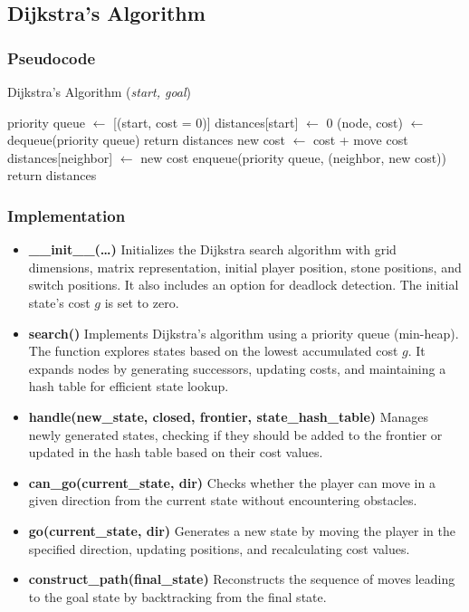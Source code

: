 \subsection{Dijkstra's Algorithm}

\subsubsection{Pseudocode}
\begin{algorithm}[H]
	\caption{Dijkstra's Algorithm (\textit{start, goal})}
	\label{alg:dijkstra}
	\begin{algorithmic}[1]
		\State priority queue \(\gets\) [(start, cost = 0)]
		\State distances[start] \(\gets\) 0
		\State (node, cost) \(\gets\) dequeue(priority queue)
		\State return distances
		\EndIf
		\State new cost \(\gets\) cost + move cost
		\State distances[neighbor] \(\gets\) new cost
		\State enqueue(priority queue, (neighbor, new cost))
		\EndIf
		\EndFor
		\EndWhile
		\State return distances
	\end{algorithmic}
\end{algorithm}

\subsubsection{Implementation}
\begin{itemize}
	\item \textbf{\_\_init\_\_(\ldots)}
	      Initializes the Dijkstra search algorithm with grid dimensions, matrix representation, initial player position, stone positions, and switch positions. It also includes an option for deadlock detection. The initial state's cost \( g \) is set to zero.

	\item \textbf{search()}
	      Implements Dijkstra's algorithm using a priority queue (min-heap). The function explores states based on the lowest accumulated cost \( g \). It expands nodes by generating successors, updating costs, and maintaining a hash table for efficient state lookup.

	\item \textbf{handle(new\_state, closed, frontier, state\_hash\_table)}
	      Manages newly generated states, checking if they should be added to the frontier or updated in the hash table based on their cost values.

	\item \textbf{can\_go(current\_state, dir)}
	      Checks whether the player can move in a given direction from the current state without encountering obstacles.

	\item \textbf{go(current\_state, dir)}
	      Generates a new state by moving the player in the specified direction, updating positions, and recalculating cost values.

	\item \textbf{construct\_path(final\_state)}
	      Reconstructs the sequence of moves leading to the goal state by backtracking from the final state.
\end{itemize}

